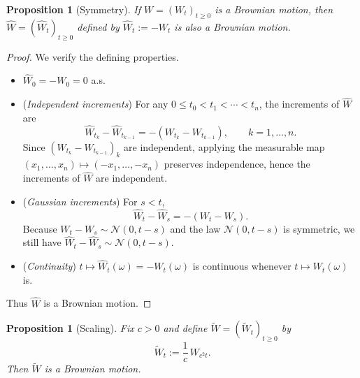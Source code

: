 \documentclass[11pt]{article}
\newtheorem{proposition}[theorem]{Proposition}
\theoremstyle{definition}
\theoremstyle{remark}
\begin{document}

\begin{proposition}[Symmetry]
If $W=(W_t)_{t\ge0}$ is a Brownian motion, then $\widehat W=(\widehat W_t)_{t\ge0}$ defined by
$\widehat W_t:=-W_t$ is also a Brownian motion.
\end{proposition}

\begin{proof}
We verify the defining properties.
\begin{itemize}[leftmargin=1.5em]
\item $\widehat W_0=-W_0=0$ a.s.
\item (\emph{Independent increments}) For any $0\le t_0<t_1<\cdots<t_n$, the increments of $\widehat W$ are
\[
\widehat W_{t_k}-\widehat W_{t_{k-1}}
=-(W_{t_k}-W_{t_{k-1}}),\qquad k=1,\dots,n.
\]
Since $(W_{t_k}-W_{t_{k-1}})_{k}$ are independent, applying the measurable map
$(x_1,\dots,x_n)\mapsto (-x_1,\dots,-x_n)$ preserves independence, hence the increments of $\widehat W$ are independent.
\item (\emph{Gaussian increments}) For $s<t$,
\[
\widehat W_t-\widehat W_s=-(W_t-W_s).
\]
Because $W_t-W_s\sim \mathcal N(0,t-s)$ and the law $\mathcal N(0,t-s)$ is symmetric, we still have
$\widehat W_t-\widehat W_s\sim \mathcal N(0,t-s)$.
\item (\emph{Continuity}) $t\mapsto \widehat W_t(\omega)=-W_t(\omega)$ is continuous whenever $t\mapsto W_t(\omega)$ is.
\end{itemize}
Thus $\widehat W$ is a Brownian motion.
\end{proof}


\begin{proposition}[Scaling]
Fix $c>0$ and define $\widetilde W=(\widetilde W_t)_{t\ge0}$ by
\[
\widetilde W_t:=\frac1c\,W_{c^2 t}.
\]
Then $\widetilde W$ is a Brownian motion.
\end{proposition}
\end{document}
